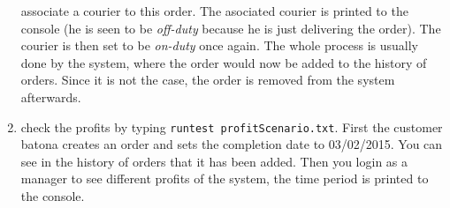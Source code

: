 \begin{enumerate}[itemsep=0mm]
		associate a courier to this order. The asociated courier is printed to the console 
		(he is seen to be \textit{off-duty} because he is just delivering the order). 
		The courier is then set to be \textit{on-duty} once again. The whole process is 
		usually done by the system, where the order would now be added to the history of 
		orders. Since it is not the case, the order is removed from the system afterwards.
	\item check the profits by typing \lstinline|runtest profitScenario.txt|. First the customer
		batona creates an order and sets the completion date to \textsc{03/02/2015}. You can 
		see in the history of orders that it has been added. Then you login as a manager to 
		see different profits of the system, the time period is printed to the console.
	
	
		
\end{enumerate}

